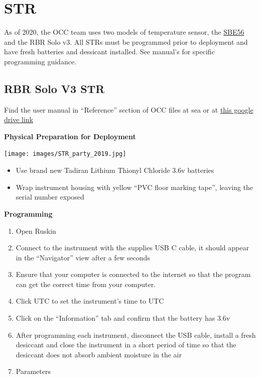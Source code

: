 \documentclass[
]{book}
\begin{document}
\hypertarget{str}{%
\chapter{STR}\label{str}}

As of 2020, the OCC team uses two models of temperature sensor, the \protect\hyperlink{sbe56}{SBE56} and the RBR Solo v3. All STRs must be programmed prior to deployment and have fresh batteries and dessicant installed. See manual's for specific programming guidance.

\hypertarget{rbr-solo-v3-str}{%
\section{RBR Solo V3 STR}\label{rbr-solo-v3-str}}

Find the user manual in ``Reference'' section of OCC files at sea or at \href{https://drive.google.com/drive/folders/1U-g1gTLOArcf7o5yXx-76z2HU-ha1qCJ}{this google drive link}

\textbf{Physical Preparation for Deployment}

\texttt{[image: images/STR\_party\_2019.jpg]}

\begin{itemize}
\item
  Use brand new Tadiran Lithium Thionyl Chloride 3.6v batteries
\item
  Wrap instrument housing with yellow ``PVC floor marking tape'', leaving the serial number exposed
\end{itemize}

\textbf{Programming}

\begin{enumerate}
\def\labelenumi{\arabic{enumi}.}
\item
  Open Ruskin
\item
  Connect to the instrument with the supplies USB C cable, it should appear in the ``Navigator'' view after a few seconds
\item
  Ensure that your computer is connected to the internet so that the program can get the correct time from your computer.
\item
  Click UTC to set the instrument's time to UTC
\item
  Click on the ``Information'' tab and confirm that the battery has 3.6v
\item
  After programming each instrument, disconnect the USB cable, install a fresh desiccant and close the instrument in a short period of time so that the desiccant does not absorb ambient moisture in the air
\item
  Parameters
\end{enumerate}
\end{document}
